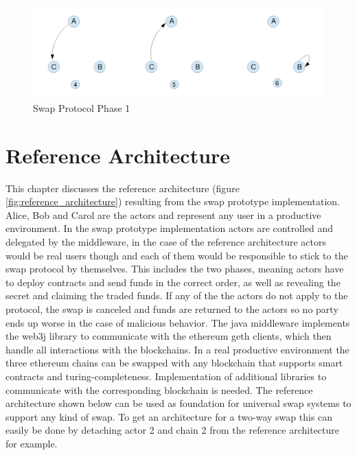 \begin{figure}[h]
	\includegraphics[width=0.7\paperwidth]{phase1}
	\caption{Swap Protocol Phase 1}
	\label{fig:phase1}
\end{figure}

\clearpage


\section{Reference Architecture}
\label{sec:chapter04:ref_architecture}

This chapter discusses the reference architecture (figure \ref{fig:reference_architecture}) resulting from the swap prototype implementation. Alice, Bob and Carol are the actors and represent any user in a productive environment. In the swap prototype implementation actors are controlled and delegated by the middleware, in the case of the reference architecture actors would be real users though and each of them would be responsible to stick to the swap protocol by themselves. This includes the two phases, meaning actors have to deploy contracts and send funds in the correct order, as well as revealing the secret and claiming the traded funds. If any of the the actors do not apply to the protocol, the swap is canceled and funds are returned to the actors so no party ends up worse in the case of malicious behavior. The java middleware implements the web3j library to communicate with the ethereum geth clients, which then handle all interactions with the blockchains. In a real productive environment the three ethereum chains can be swapped with any blockchain that supports smart contracts and turing-completeness. Implementation of additional libraries to communicate with the corresponding blockchain is needed. The reference architecture shown below can be used as foundation for universal swap systems to support any kind of swap. To get an architecture for a two-way swap this can easily be done by detaching actor 2 and chain 2 from the reference architecture for example. \newline \newline

